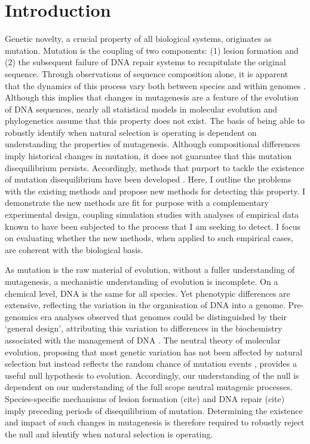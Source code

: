 \chapter{Introduction}
Genetic novelty, a crucial property of all biological systems, originates as mutation. Mutation is the coupling of two components: (1) lesion formation and (2) the subsequent failure of DNA repair systems to recapitulate the original sequence. Through observations of sequence composition alone, it is apparent that the dynamics of this process vary both between species \citep{Karlin1994ComparisonsSequences} and within genomes \citep{Francioli2015Genome-wideHumans}. Although this implies that changes in mutagenesis are a feature of the evolution of DNA sequences, nearly all statistical models in molecular evolution and phylogenetics assume that this property does not exist. The basis of being able to robustly identify when natural selection is operating is dependent on understanding the properties of mutagenesis. Although compositional differences imply historical changes in mutation, it does not guarantee that this mutation disequilibrium persists. Accordingly, methods that purport to tackle the existence of mutation disequilibrium have been developed \citep{Squartini2008QuantifyingProcess, Singh2009StrongDrosophila, Ababneh2006Matched-pairsSequences}. Here, I outline the problems with the existing methods and propose new methods for detecting this property. I demonstrate the new methods are fit for purpose with a complementary experimental design, coupling simulation studies with analyses of empirical data known to have been subjected to the process that I am seeking to detect. I focus on evaluating whether the new methods, when applied to such empirical cases, are coherent with the biological basis.

As mutation is the raw material of evolution, without a fuller understanding of mutagenesis, a mechanistic understanding of evolution is incomplete. On a chemical level, DNA is the same for all species. Yet phenotypic differences are extensive, reflecting the variation in the organisation of DNA into a genome. Pre-genomics era analyses observed that genomes could be distinguished by their `general design', attributing this variation to differences in the biochemistry associated with the management of DNA \citep{Karlin1994ComparisonsSequences, Karlin1995DinucleotideSignature}. The neutral theory of molecular evolution, proposing that most genetic variation has not been affected by natural selection but instead reflects the random chance of mutation events \citep{Kimura1968EvolutionaryLevel, King1969Non-DarwinianEvolution}, provides a useful null hypothesis to evolution. Accordingly, our understanding of the null is dependent on our understanding of the full scope neutral mutagenic processes. Species-specific mechanisms of lesion formation (cite) and DNA repair (cite) imply preceding periods of disequilibrium of mutation. Determining the existence and impact of such changes in mutagenesis is therefore required to robustly reject the null and identify when natural selection is operating.

